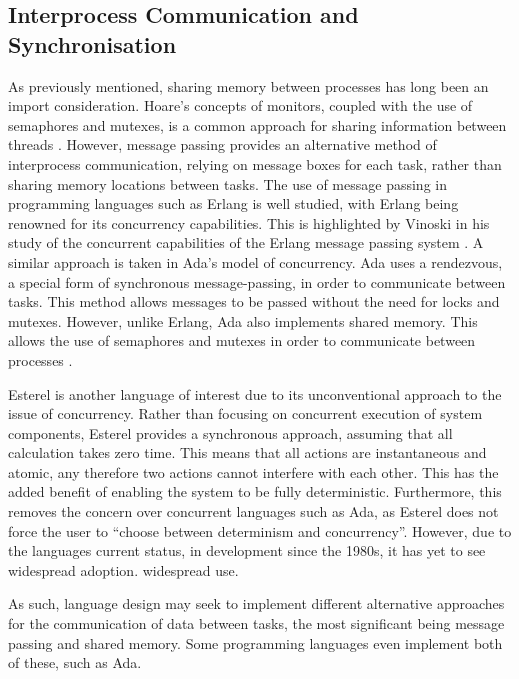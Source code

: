 \subsection{Interprocess Communication and Synchronisation} %
As previously mentioned, sharing memory between processes has long been an import
consideration. Hoare's concepts of monitors, coupled with the use of semaphores
and mutexes, is a common approach for sharing information between threads
\cite{Hoare:1974:MOS:355620.361161}.  However, message passing provides an
alternative method of interprocess communication, relying on message boxes for
each task, rather than sharing memory locations between tasks.  The use of
message passing in programming languages such as Erlang is well studied, with
Erlang being renowned for its concurrency capabilities. This is highlighted by
Vinoski in his study of the concurrent capabilities of the Erlang message
passing system \cite{6216341}. A similar approach is taken in Ada's model of
concurrency. Ada uses a rendezvous, a special form of synchronous
message-passing, in order to communicate between tasks. This method allows
messages to be passed without the need for locks and mutexes. However, unlike
Erlang, Ada also implements shared memory. This allows the use of semaphores
and mutexes in order to communicate between processes
\cite{burns1998concurrency}.  
\par\bigskip\noindent
Esterel is another language of interest due to its unconventional approach to the issue of 
concurrency. Rather than focusing on concurrent execution of system components, 
Esterel provides a synchronous approach, assuming that all calculation 
takes zero time. This means that all actions are instantaneous and atomic, 
any therefore two actions cannot interfere with each other. 
This has the added benefit of enabling the system to be fully deterministic. 
Furthermore, this removes the concern over concurrent languages such as Ada, 
as Esterel does not force the user to ``choose between determinism and concurrency''.
However, due to the languages current status, in development since the 1980s, 
it has yet to see widespread adoption. 
widespread use. 
\cite{esterel}
\par\bigskip\noindent
As such, language design
may seek to implement different alternative approaches for the communication of data
between tasks, the most significant being message passing and shared memory. 
Some programming languages even implement both of these, such as Ada.

